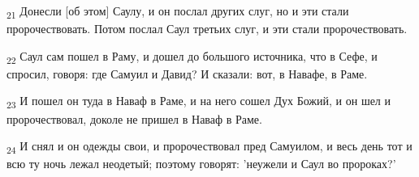 \begin{tcolorbox}
\textsubscript{21} Донесли [об этом] Саулу, и он послал других слуг, но и эти стали пророчествовать. Потом послал Саул третьих слуг, и эти стали пророчествовать.
\end{tcolorbox}
\begin{tcolorbox}
\textsubscript{22} Саул сам пошел в Раму, и дошел до большого источника, что в Сефе, и спросил, говоря: где Самуил и Давид? И сказали: вот, в Навафе, в Раме.
\end{tcolorbox}
\begin{tcolorbox}
\textsubscript{23} И пошел он туда в Наваф в Раме, и на него сошел Дух Божий, и он шел и пророчествовал, доколе не пришел в Наваф в Раме.
\end{tcolorbox}
\begin{tcolorbox}
\textsubscript{24} И снял и он одежды свои, и пророчествовал пред Самуилом, и весь день тот и всю ту ночь лежал неодетый; поэтому говорят: 'неужели и Саул во пророках?'
\end{tcolorbox}

